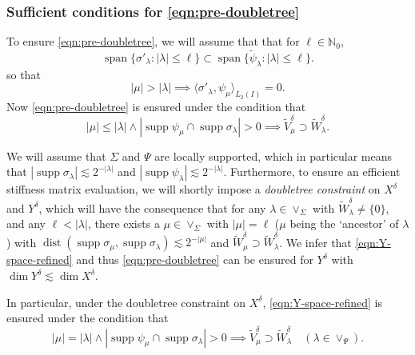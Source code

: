\documentclass[11pt,a4paper,oneside,english]{amsart}
\numberwithin{equation}{section}
\numberwithin{theorem}{section}
\theoremstyle{definition}
\newcommand{\N}{\mathbb{N}}
\DeclareMathOperator{\supp}{supp}
\DeclareMathOperator{\spann}{span}
\DeclareMathOperator{\dist}{dist}
\newcommand{\la}{\langle}
\newcommand{\ra}{\rangle}
\newcommand{\jw}[1]{{\color{red}{JW: #1}}}
\begin{document}
\subsubsection{Sufficient conditions for \eqref{eqn:pre-doubletree}}
\label{sec:spaces}
To ensure \eqref{eqn:pre-doubletree}, we will assume that that for $\ell \in \N_0$,
\[
\spann\{\sigma'_\lambda\colon |\lambda|\leq \ell\} \subset \spann\{\tilde{\psi}_\lambda\colon |\lambda|\leq \ell\}.
\]
 so that
\begin{equation}
  \label{eqn:deriv-orthogonal}
  |\mu| >|\lambda| \implies \la \sigma'_\lambda,\psi_\mu\ra_{L_2(I)}=0.
 \end{equation}
Now \eqref{eqn:pre-doubletree} is ensured under the condition that
\begin{equation}
\label{eqn:Y-space-refined}
  |\mu| \leq |\lambda| \wedge|\supp \psi_\mu \cap \supp \sigma_\lambda|>0 \implies \tilde{V}^\delta_\mu \supset  \tilde{W}^\delta_\lambda.
\end{equation}

We will assume that $\Sigma$ and $\Psi$ are locally supported, which in particular
means that $|\supp \sigma_\lambda| \lesssim 2^{-|\lambda|}$ and
$|\supp \psi_\lambda| \lesssim 2^{-|\lambda|}$. Furthermore, to ensure an
efficient stiffness matrix evaluation, we will shortly impose a \emph{doubletree constraint}\jw{definitie maken?}
on $X^\delta$ and $Y^\delta$, which will have the consequence that for any
$\lambda \in \vee_\Sigma$ with $\tilde{W}_\lambda^\delta \neq \{0\}$, and any
$\ell <|\lambda|$, there exists a $\mu \in \vee_\Sigma$ with $|\mu|=\ell$
($\mu$ being the `ancestor' of $\lambda$) with
$\dist(\supp \sigma_\mu,\supp \sigma_\lambda)\lesssim 2^{-|\mu|}$ and
$\tilde{W}_\mu^\delta \supset \tilde{W}_\lambda^\delta$.
We infer that \eqref{eqn:Y-space-refined} and thus \eqref{eqn:pre-doubletree} can
be ensured for $Y^\delta$ with $\dim Y^\delta \lesssim \dim X^\delta$.

In particular, under the doubletree constraint on $X^\delta$, \eqref{eqn:Y-space-refined}
is ensured under the condition that\jw{ik heb dit niet gecheckt, bovendien heb ik $S(\lambda)$ eruit gesloopt}
\[
  |\mu| = |\lambda| \wedge|\supp \psi_\mu \cap \supp \sigma_\lambda|>0 \implies \tilde{V}^\delta_\mu \supset  \tilde{W}^\delta_\lambda \quad (\lambda \in \vee_\Psi).
\]
\jw{Dit is min-of-meer copy-paste uit followup maar ik vind het nu nog wel cryptisch :-(}
\end{document}

